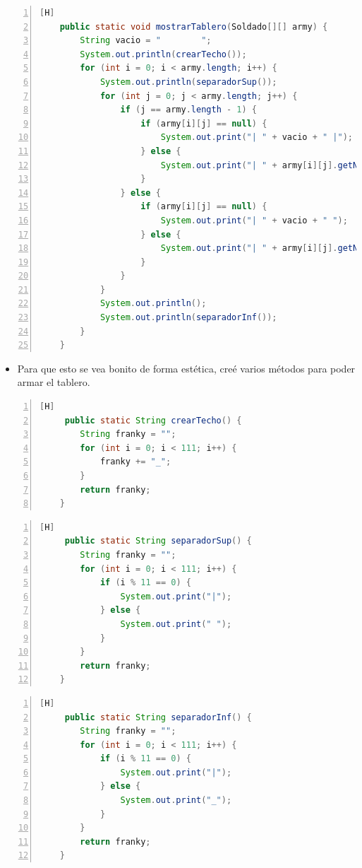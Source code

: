 \documentclass{article}
\begin{document}
	\begin{lstlisting}[language=java,caption={Mostrar el tablero}, numbers=left][H]
	public static void mostrarTablero(Soldado[][] army) {
        String vacio = "        ";
        System.out.println(crearTecho());
        for (int i = 0; i < army.length; i++) {
            System.out.println(separadorSup());
            for (int j = 0; j < army.length; j++) {
                if (j == army.length - 1) {
                    if (army[i][j] == null) {
                        System.out.print("| " + vacio + " |");
                    } else {
                        System.out.print("| " + army[i][j].getNombre() + " |");
                    }
                } else {
                    if (army[i][j] == null) {
                        System.out.print("| " + vacio + " ");
                    } else {
                        System.out.print("| " + army[i][j].getNombre() + " ");
                    }
                }
            }
            System.out.println();
            System.out.println(separadorInf());
        }
    }
	\end{lstlisting}	
	\begin{itemize}	
		\item Para que esto se vea bonito de forma estética, creé varios métodos para poder armar el tablero.
	\end{itemize}
	\begin{lstlisting}[language=java,caption={Método para la fila superior del todo}, numbers=left][H]
	 public static String crearTecho() {
        String franky = "";
        for (int i = 0; i < 111; i++) {
            franky += "_";
        }
        return franky;
    }
	\end{lstlisting}
	\begin{lstlisting}[language=java,caption={Método para separar las lineas(Parte superior)}, numbers=left][H]
	 public static String separadorSup() {
        String franky = "";
        for (int i = 0; i < 111; i++) {
            if (i % 11 == 0) {
                System.out.print("|");
            } else {
                System.out.print(" ");
            }
        }
        return franky;
    }
	\end{lstlisting}
	\begin{lstlisting}[language=java,caption={Método para separar las lineas(Parte inferior)}, numbers=left][H]
	 public static String separadorInf() {
        String franky = "";
        for (int i = 0; i < 111; i++) {
            if (i % 11 == 0) {
                System.out.print("|");
            } else {
                System.out.print("_");
            }
        }
        return franky;
    }
	\end{lstlisting}
	
\end{document}
